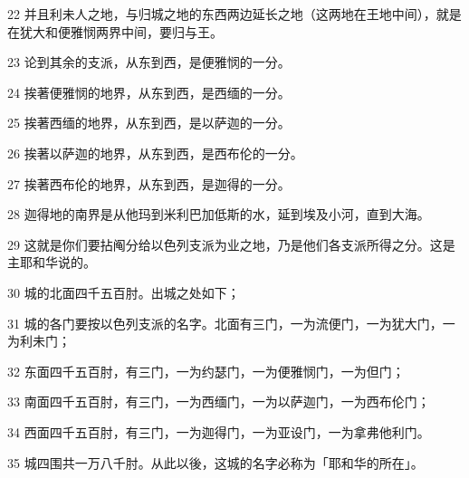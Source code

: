 \par 22 并且利未人之地，与归城之地的东西两边延长之地（这两地在王地中间），就是在犹大和便雅悯两界中间，要归与王。
\par 23 论到其余的支派，从东到西，是便雅悯的一分。
\par 24 挨著便雅悯的地界，从东到西，是西缅的一分。
\par 25 挨著西缅的地界，从东到西，是以萨迦的一分。
\par 26 挨著以萨迦的地界，从东到西，是西布伦的一分。
\par 27 挨著西布伦的地界，从东到西，是迦得的一分。
\par 28 迦得地的南界是从他玛到米利巴加低斯的水，延到埃及小河，直到大海。
\par 29 这就是你们要拈阄分给以色列支派为业之地，乃是他们各支派所得之分。这是主耶和华说的。
\par 30 城的北面四千五百肘。出城之处如下；
\par 31 城的各门要按以色列支派的名字。北面有三门，一为流便门，一为犹大门，一为利未门；
\par 32 东面四千五百肘，有三门，一为约瑟门，一为便雅悯门，一为但门；
\par 33 南面四千五百肘，有三门，一为西缅门，一为以萨迦门，一为西布伦门；
\par 34 西面四千五百肘，有三门，一为迦得门，一为亚设门，一为拿弗他利门。
\par 35 城四围共一万八千肘。从此以後，这城的名字必称为「耶和华的所在」。


